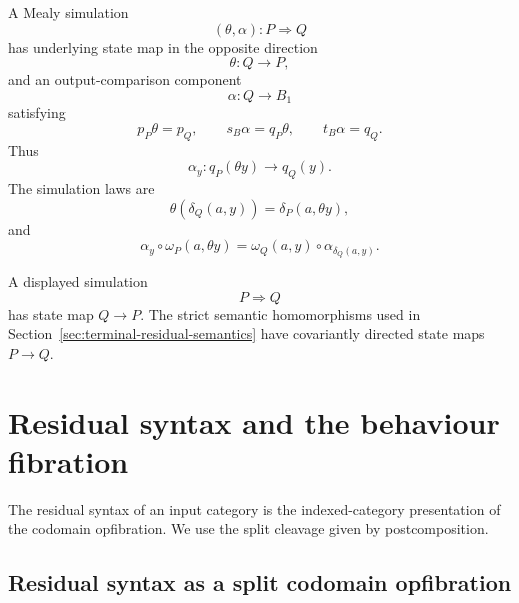 \begin{notation}
\label{not:simulation-recall-behaviour}
    A Mealy simulation
    \[
        (\theta,\alpha):P\Rightarrow Q
    \]
    has underlying state map in the opposite direction
    \[
        \theta:Q\to P,
    \]
    and an output-comparison component
    \[
        \alpha:Q\to B_1
    \]
    satisfying
    \[
        p_P\theta=p_Q,
        \qquad
        s_B\alpha=q_P\theta,
        \qquad
        t_B\alpha=q_Q.
    \]
    Thus
    \[
        \alpha_y:q_P(\theta y)\to q_Q(y).
    \]
    The simulation laws are
    \[
        \theta(\delta_Q(a,y))
        =
        \delta_P(a,\theta y),
    \]
    and
    \[
        \alpha_y\circ\omega_P(a,\theta y)
        =
        \omega_Q(a,y)\circ\alpha_{\delta_Q(a,y)}.
    \]
\end{notation}

\begin{remark}
\label{rem:simulation-direction-warning-behaviour}
    A displayed simulation
    \[
        P\Rightarrow Q
    \]
    has state map \(Q\to P\). The strict semantic homomorphisms used in Section~\ref{sec:terminal-residual-semantics} have covariantly directed state maps \(P\to Q\).
\end{remark}

\section{Residual syntax and the behaviour fibration}
\label{sec:residual-syntax-behaviour-fibration}

The residual syntax of an input category is the indexed-category presentation of the codomain opfibration. We use the split cleavage given by postcomposition.

\subsection{Residual syntax as a split codomain opfibration}
\label{subsec:residual-opfibration}

